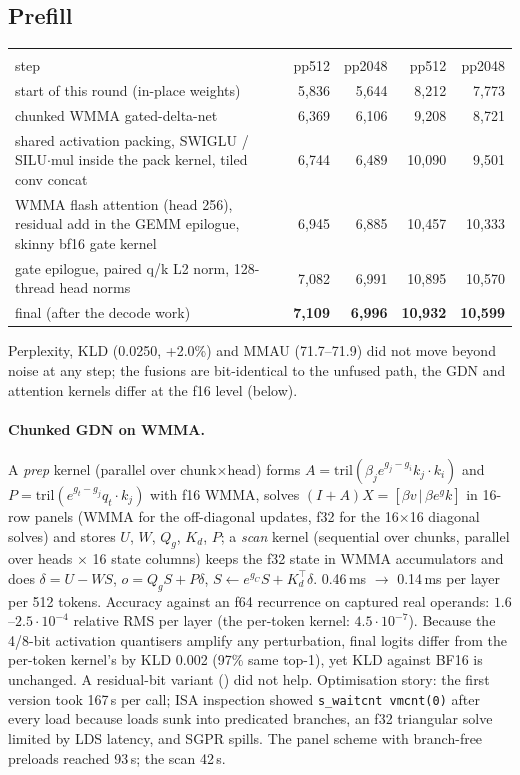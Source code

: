 \documentclass[10pt,a4paper]{article}
\newcommand{\tx}[1]{\texttt{\detokenize{#1}}}
\begin{document}
\subsection{Prefill}
\begin{center}\small
\begin{tabular}{@{}p{7.4cm}rrrr@{}}
\toprule
 & \multicolumn{2}{c}{\tx{quality}} & \multicolumn{2}{c}{\tx{fast}}\\
step & pp512 & pp2048 & pp512 & pp2048\\
\midrule
start of this round (in-place weights) & 5{,}836 & 5{,}644 & 8{,}212 & 7{,}773\\
chunked WMMA gated-delta-net & 6{,}369 & 6{,}106 & 9{,}208 & 8{,}721\\
shared activation packing, SWIGLU / SILU$\cdot$mul inside the pack kernel, tiled conv concat & 6{,}744 & 6{,}489 & 10{,}090 & 9{,}501\\
WMMA flash attention (head 256), residual add in the GEMM epilogue, skinny bf16 gate kernel & 6{,}945 & 6{,}885 & 10{,}457 & 10{,}333\\
gate epilogue, paired q/k L2 norm, 128-thread head norms & 7{,}082 & 6{,}991 & 10{,}895 & 10{,}570\\
final (after the decode work) & \textbf{7{,}109} & \textbf{6{,}996} & \textbf{10{,}932} & \textbf{10{,}599}\\
\bottomrule
\end{tabular}
\end{center}
Perplexity, KLD (0.0250, +2.0\%) and MMAU (71.7--71.9) did not move beyond noise at any step; the fusions are bit-identical to the unfused
path, the GDN and attention kernels differ at the f16 level (below).

\paragraph{Chunked GDN on WMMA.} A \emph{prep} kernel (parallel over chunk$\times$head) forms $A=\mathrm{tril}(\beta_j e^{g_j-g_i}k_j\!\cdot\!k_i)$
and $P=\mathrm{tril}(e^{g_t-g_j}q_t\!\cdot\!k_j)$ with f16 WMMA, solves $(I+A)X=[\beta v\,|\,\beta e^{g}k]$ in 16-row panels (WMMA for the off-diagonal
updates, f32 for the 16$\times$16 diagonal solves) and stores $U$, $W$, $Q_g$, $K_d$, $P$; a \emph{scan} kernel (sequential over chunks,
parallel over heads $\times$ 16 state columns) keeps the f32 state in WMMA accumulators and does $\delta=U-WS$, $o=Q_gS+P\delta$,
$S\leftarrow e^{g_C}S+K_d^{\!\top}\delta$. 0.46\,ms $\to$ 0.14\,ms per layer per 512 tokens. Accuracy against an f64 recurrence on captured real
operands: $1.6$--$2.5\cdot10^{-4}$ relative RMS per layer (the per-token kernel: $4.5\cdot10^{-7}$). Because the 4/8-bit activation
quantisers amplify any perturbation, final logits differ from the per-token kernel's by KLD 0.002 (97\% same top-1), yet KLD against BF16 is
unchanged. A residual-bit variant (\tx{GGML_GDN_CHUNK=2}) did not help. Optimisation story: the first version took 167\,\textmu s per call; ISA inspection
showed \texttt{s\_waitcnt vmcnt(0)} after every load because loads sunk into predicated branches, an f32 triangular solve limited by LDS latency, and
SGPR spills. The panel scheme with branch-free preloads reached 93\,\textmu s; the scan 42\,\textmu s.
\end{document}
